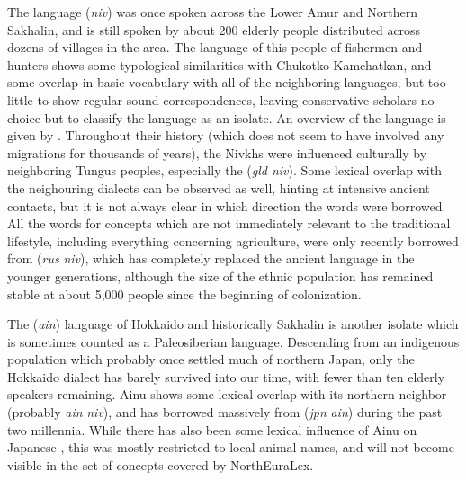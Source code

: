 The  language (\textit{niv}) was once spoken across the Lower Amur and Northern Sakhalin, and is still spoken by about 200 elderly people distributed across dozens of villages in the area. The language of this people of fishermen and hunters shows some typological similarities with Chukotko-Kamchatkan, and some overlap in basic vocabulary with all of the neighboring languages, but too little to show regular sound correspondences, leaving conservative scholars no choice but to classify the language as an isolate. An overview of the language is given by \cite{gruzdeva1998}. Throughout their history (which does not seem to have involved any migrations for thousands of years), the Nivkhs were influenced culturally by neighboring Tungus peoples, especially the  (\textit{gld \arrowLA niv}). Some lexical overlap with the neighouring  dialects can be observed as well, hinting at intensive ancient contacts, but it is not always clear in which direction
the words were borrowed. All the words for concepts which are not immediately relevant to the traditional lifestyle, including everything concerning agriculture, were only recently borrowed from  (\textit{rus} \arrowLA \textit{niv}), which has completely replaced the ancient language in the younger generations, although the size of the ethnic population has remained stable at about 5,000 people since the beginning of colonization.

The  (\textit{ain}) language of Hokkaido and historically Sakhalin is another isolate which is sometimes counted as a Paleosiberian language. Descending from an indigenous population which probably once settled much of northern Japan, only the Hokkaido dialect has barely survived into our time, with fewer than ten elderly speakers remaining. Ainu shows some lexical overlap with its northern neighbor  (probably \textit{ain} \arrowLA \textit{niv}), and has borrowed massively from  (\textit{jpn} \arrowLA \textit{ain}) during the past two millennia. While there has also been some lexical influence of Ainu on Japanese \citep{schmidt2009}, this was mostly restricted to local animal names, and will not become visible in the set of concepts covered by NorthEuraLex.

